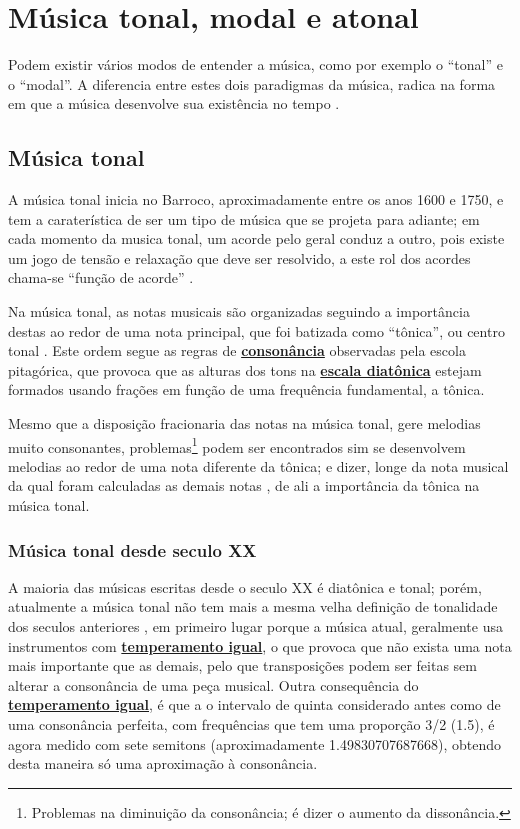 
\section{Música tonal, modal e atonal}
\label{sec:ModosEntenderMusica}
Podem existir vários modos de entender a música, como por exemplo o ``tonal'' e o ``modal''.
A diferencia entre estes dois paradigmas da música, 
radica na forma em que a música desenvolve sua existência no tempo \cite[pp. 155]{arbones2012armonia}.


\subsection{Música tonal}
\label{sec:MusicaTonal}
A música tonal inicia no Barroco, aproximadamente entre os anos 1600 e 1750,
e tem a  caraterística de ser um tipo de  música que se projeta para adiante;
em cada momento da musica tonal, um acorde pelo geral conduz a outro,
pois existe um jogo de tensão e relaxação que deve ser resolvido,
a este rol dos acordes chama-se ``função de acorde'' \cite[pp. 155-156]{arbones2012armonia}.


Na música tonal, 
as notas musicais são organizadas seguindo a importância destas ao redor de uma nota  principal,
que foi batizada como ``tônica'', ou centro tonal \cite[pp. 27]{arbones2012armonia}.
Este ordem segue as regras de \hyperref[ref:paginadiatonicanumerica]{\textbf{consonância}} observadas pela escola pitagórica,
que provoca que as alturas dos tons na \hyperref[sec:pos:Diatonica]{\textbf{escala diatônica}} 
estejam formados usando frações em função de uma frequência fundamental, a tônica.

Mesmo que a disposição fracionaria das notas na música tonal, gere melodias muito consonantes,
problemas\footnote{Problemas na diminuição da consonância; é dizer o aumento da dissonância.} 
podem ser encontrados sim se desenvolvem melodias ao redor de uma nota diferente da tônica;
e dizer, longe da nota musical da qual foram calculadas as demais notas \cite[pp. 28]{arbones2012armonia},
de ali a importância da tônica na música tonal.

\subsubsection{Música tonal desde seculo XX}
A maioria das músicas  escritas desde o seculo XX é diatônica e tonal;
porém, atualmente a música tonal não tem mais a mesma velha definição de tonalidade dos seculos anteriores  \cite[pp. 63]{copland1974ouvir},
em primeiro lugar porque a música atual, geralmente usa instrumentos com \hyperref[subsec:tempigual]{\textbf{temperamento igual}},
o que provoca que não exista uma nota mais importante que as demais, 
pelo que transposições podem ser feitas sem alterar a consonância de uma peça musical.
Outra consequência do \hyperref[subsec:tempigual]{\textbf{temperamento igual}},
é que a o intervalo de quinta considerado antes como de uma consonância perfeita,
com frequências que tem uma proporção 3/2 (1.5), é agora medido com sete semitons (aproximadamente 1.49830707687668),
obtendo desta maneira só uma aproximação à consonância.



